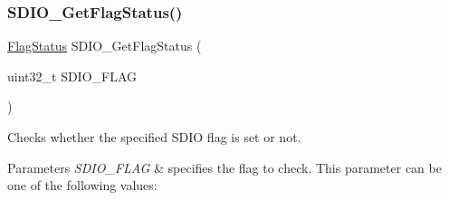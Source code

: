\subsubsection{\texorpdfstring{S\+D\+I\+O\+\_\+\+Get\+Flag\+Status()}{SDIO\_GetFlagStatus()}}
{\footnotesize\ttfamily \hyperlink{group___exported__types_ga89136caac2e14c55151f527ac02daaff}{Flag\+Status} S\+D\+I\+O\+\_\+\+Get\+Flag\+Status (\begin{DoxyParamCaption}\item[{uint32\+\_\+t}]{S\+D\+I\+O\+\_\+\+F\+L\+AG }\end{DoxyParamCaption})}



Checks whether the specified S\+D\+IO flag is set or not. 


\begin{DoxyParams}{Parameters}
{\em S\+D\+I\+O\+\_\+\+F\+L\+AG} & specifies the flag to check. This parameter can be one of the following values\+: \begin{DoxyItemize}

\end{DoxyItemize}
\end{DoxyParams}
